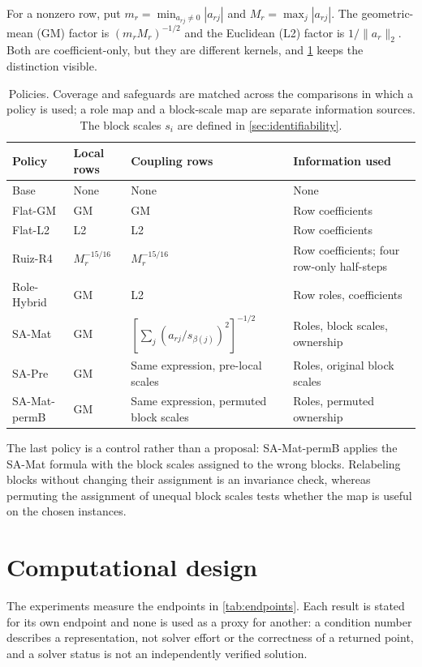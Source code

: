 \documentclass[11pt]{article}
\theoremstyle{definition}
\theoremstyle{remark}
\begin{document}
For a nonzero row, put $m_r=\min_{a_{rj}\ne0}|a_{rj}|$ and $M_r=\max_j|a_{rj}|$. The
geometric-mean (GM) factor is $(m_rM_r)^{-1/2}$ and the Euclidean (L2) factor is
$1/\|a_r\|_2$. Both are coefficient-only, but they are different kernels, and
\cref{tab:policies} keeps the distinction visible.
\begin{table}[tb]
\centering\small
\caption{Policies. Coverage and safeguards are matched across the comparisons in which a policy
is used; a role map and a block-scale map are separate information sources. The block scales
$s_i$ are defined in \cref{sec:identifiability}.}\label{tab:policies}
\begin{tabularx}{\linewidth}{llX>{\raggedright\arraybackslash}X}
\toprule
Policy & Local rows & Coupling rows & Information used\\
\midrule
Base & None & None & None\\
Flat-GM & GM & GM & Row coefficients\\
Flat-L2 & L2 & L2 & Row coefficients\\
Ruiz-R4 & $M_r^{-15/16}$ & $M_r^{-15/16}$ & Row coefficients; four row-only half-steps\\
Role-Hybrid & GM & L2 & Row roles, coefficients\\
SA-Mat & GM & $\left[\sum_j(a_{rj}/s_{\beta(j)})^2\right]^{-1/2}$ & Roles, block scales, ownership\\
SA-Pre & GM & Same expression, pre-local scales & Roles, original block scales\\
SA-Mat-permB & GM & Same expression, permuted block scales & Roles, permuted ownership\\
\bottomrule
\end{tabularx}
\end{table}

The last policy is a control rather than a proposal: SA-Mat-permB applies the SA-Mat formula
with the block scales assigned to the wrong blocks. Relabeling blocks without changing their
assignment is an invariance check, whereas permuting the assignment of unequal block scales
tests whether the map is useful on the chosen instances.





\section{Computational design}
\label{sec:experiments}
The experiments measure the endpoints in \cref{tab:endpoints}. Each result is stated for its
own endpoint and none is used as a proxy for another: a condition number describes a
representation, not solver effort or the correctness of a returned point, and a solver status is
not an independently verified solution.
\end{document}
